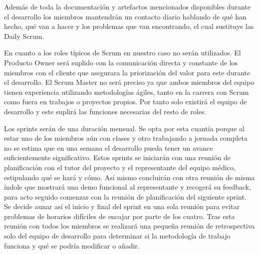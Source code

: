     Además de toda la documentación y artefactos mencionados disponibles durante el desarrollo los miembros mantendrán un contacto diario hablando de qué han hecho, qué van a hacer y los problemas que van encontrando, el cual sustituye las Daily Scrum.\newline

	En cuanto a los roles típicos de Scrum en nuestro caso no serán utilizados. El Producto Owner será suplido con la comunicación directa y constante  de los miembros con el cliente que asegurara la priorización del valor para este durante el desarrollo. El Scrum Master no será preciso ya que ambos miembros del equipo tienen experiencia utilizando metodologías ágiles, tanto en la carrera con Scrum como fuera en trabajos o proyectos propios. Por tanto solo existirá el equipo de desarrollo y este suplirá las funciones necesarias del resto de roles.\newline

	Los sprints serán de una duración mensual. Se opta por esta cuantía porque al estar uno de los miembros aún con clases y otro trabajando a jornada completa no se estima que en una semana el desarrollo pueda tener un avance suficientemente significativo. Estos sprints se iniciarán con una reunión de planificación con el tutor del proyecto y el representante del equipo médico, estipulando qué se hará y cómo. Así mismo concluirán con otra reunión de misma índole que mostrará una demo funcional al representante y recogerá su feedback, para acto seguido comenzar con la reunión de planificación del siguiente sprint. Se decide aunar así el inicio y final del sprint en una sola reunión para evitar problemas de horarios difíciles de encajar por parte de los cuatro. Tras esta reunión con todos los miembros se realizará una pequeña reunión de retrospectiva solo del equipo de desarrollo para determinar si la metodología de trabajo funciona y qué se podría modificar o añadir.\newline


